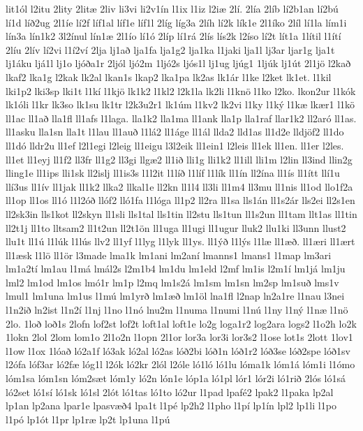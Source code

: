 {lit1ól
l2itu
2lity
2litæ
2liv
li3vi
li2v1ín
l1ix
l1iz
l2iæ
2lí.
2lía
2líb
lí2b1an
lí2bú
lí1d
líð2ug
2l1íe
lí2f
líf1al
líf1e
líf1l
2líg
líg3a
2líh
lí2k
lík1e
2l1íko
2líl
lí1la
lím1i
lín3a
lín1k2
3l2ínul
lín1æ
2l1ío
lí1ó
2líp
lí1rá
2lís
lís2k
l2íso
lí2t
lít1a
1lítil
l1ítí
2líu
2lív
lí2vi
l1í2ví
2lja
lj1að
lja1fa
lja1g2
lja1ka
l1jaki
lja1l
lj3ar
ljar1g
lja1t
lj1áku
ljá1l
lj1o
ljóða1r
2ljól
ljó2m
1ljó2s
ljós1l
lj1ug
ljúg1
1ljúk
lj1út
2l1jö
l2kað
lkaf2
lka1g
l2kak
lk2al
lkan1s
lkap2
lka1pa
lk2as
lk1ár
l1ke
l2ket
lk1et.
l1kil
lki1p2
lki3sp
lki1t
l1kí
l1kjö
lk1k2
l1kl2
l2k1la
lk2li
l1knö
l1ko
l2ko.
lkon2ur
l1kók
lk1óli
l1kr
lk3so
lk1su
lk1tr
l2k3u2r1
lk1úm
l1kv2
lk2vi
l1ky
l1ký
l1kæ
lkær1
l1kö
ll1ac
ll1að
lla1fl
ll1afs
l1laga.
lla1k2
lla1ma
ll1ank
lla1p
lla1raf
llar1k2
ll2aró
ll1as.
ll1asku
lla1sn
lla1t
l1lau
ll1auð
l1lá2
ll1áge
ll1ál
llda2
lld1as
ll1d2e
lldjöf2
ll1do
ll1dó
lldr2u
ll1ef
l2l1egi
l2leig
ll1eigu
l3l2eik
ll1ein1
l2leis
ll1ek
ll1en.
ll1er
l2les.
ll1et
ll1eyj
ll1f2
ll3fr
ll1g2
ll3gi
llgæ2
ll1ið
lli1g
lli1k2
ll1ill
lli1m
l2lin
ll3ind
llin2g
lling1e
ll1ips
lli1sk
ll2islj
ll1is3s
l1l2it
l1líð
l1líf
l1lík
ll1ín
ll2ína
ll1ís
ll1ítt
llí1u
llí3us
ll1ív
ll1jak
ll1k2
llka2
llkal1e
ll2kn
ll1l4
ll3li
ll1m4
ll3mu
ll1nis
ll1od
llo1f2a
ll1op
ll1os
ll1ó
l1l2óð
llóf2
lló1fa
l1lóga
ll1p2
ll2ra
ll1sa
lls1án
ll1s2ár
lls2ei
ll2s1en
ll2sk3in
lls1kot
ll2skyn
ll1sli
lls1tal
lls1tin
ll2stu
lls1tun
ll1s2un
ll1tam
llt1as
ll1tin
ll2t1j
ll1to
lltsam2
ll1t2un
ll2t1ön
ll1uga
ll1ugi
ll1ugur
lluk2
llu1ki
ll3unn
llust2
llu1t
ll1ú
l1lúk
l1lús
llv2
ll1yf
l1lyg
l1lyk
ll1ys.
ll1ýð
l1lýs
l1læ
ll1æð.
ll1æri
ll1ært
ll1æsk
l1lö
ll1ör
l3made
lma1k
lm1ani
lm2aní
lmanns1
lmans1
l1map
lm3ari
lm1a2tí
lm1au
l1má
lmál2s
l2m1b4
lm1du
lm1eld
l2mf
lm1is
l2m1í
lm1já
lm1ju
lml2
lm1od
lm1os
lmó1r
lm1p
l2mq
lm1s2á
lm1sm
lm1sn
lm2sp
lm1suð
lms1v
lmul1
lm1una
lm1us
l1mú
lm1yrð
lm1æð
lm1öl
lna1fl
l2nap
ln2a1re
l1nau
l3nei
l1n2ið
ln2ist
l1n2í
l1nj
l1no
l1nó
lnu2m
l1numa
l1numi
l1nú
l1ny
l1ný
l1næ
l1nö
2lo.
1loð
loð1s
2lofn
lof2st
lof2t
loft1al
loft1e
lo2g
loga1r2
log2ara
logs2
l1o2h
lo2k
1lokn
2lol
2lom
lom1o
2l1o2n
l1opn
2l1or
lor3a
lor3i
lor3s2
l1ose
lot1s
2lott
1lov1
l1ow
l1ox
1lóað
ló2a1f
ló3ak
ló2al
ló2as
lóð2bi
lóð1n
lóð1r2
lóð3se
lóð2spe
lóð1sv
l2ófa
lóf3ar
ló2fæ
lóg1l
l2ók
ló2kr
2lól
l2óle
ló1ló
ló1lu
lóma1k
lóm1á
lóm1i
l1ómo
lóm1sa
lóm1sn
lóm2sæt
lóm1y
ló2n
lón1e
lóp1a
ló1pl
lór1
lór2i
ló1rið
2lós
ló1sá
ló2set
ló1sí
ló1sk
ló1sl
2lót
ló1tas
ló1to
ló2ur
l1pad
lpafé2
lpak2
l1paka
lp2al
lp1an
lp2ana
lpar1e
lpasvæð4
lpa1t
l1pé
lp2h2
l1pho
l1pí
lp1ín
lpl2
lp1li
l1po
l1pó
lp1ót
l1pr
lp1ræ
lp2t
lp1una
l1pú
}
